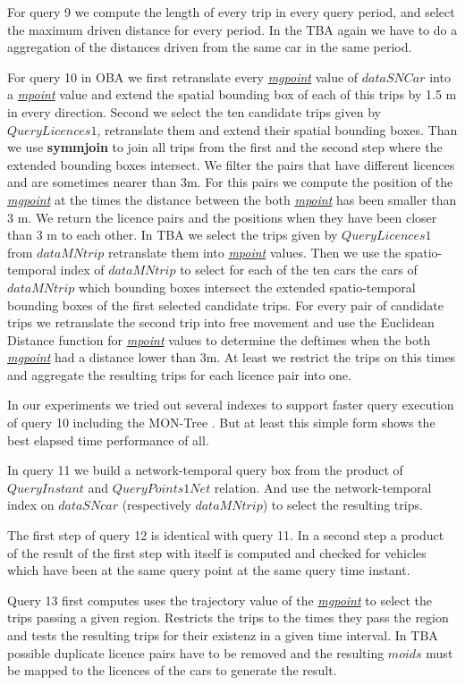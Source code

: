 \documentclass[a4paper]{article}
\newcommand{\op}[1]{\textbf{#1}}
\newcommand{\dt}[1]{\textsl{\underline{#1}}}
\begin{document}
For query 9 we compute the length of every trip in every query period, and select the
 maximum driven distance for every period. In the TBA again we have to do a
 aggregation of the distances driven from the same car in the same period.

For query 10 in OBA we first retranslate every \dt{mgpoint} value of $dataSNCar$ into
 a  \dt{mpoint} value and extend the spatial bounding box of each of this
 trips by 1.5 m in every direction. Second we select the ten candidate trips given by
 $QueryLicences1$, retranslate them and extend their spatial bounding boxes. Than we
 use \op{symmjoin} to join all trips from the first and the second step where the
 extended bounding boxes intersect. We filter the pairs that have different licences
 and are sometimes nearer than 3m. For this pairs we compute the position of the
 \dt{mgpoint} at the times the distance between the both \dt{mpoint} has been smaller
 than 3 m. We return the licence pairs and the positions when they have been closer
 than 3 m to each other. In TBA we select the trips given by $QueryLicences1$ from
$dataMNtrip$ retranslate them into \dt{mpoint} values. Then we use the
spatio-temporal index of $dataMNtrip$ to select for each of the ten cars the cars
of $dataMNtrip$ which bounding boxes intersect the extended spatio-temporal bounding
 boxes of the first selected candidate trips. For every pair of candidate trips we
 retranslate  the second trip into free movement and use the Euclidean Distance
function for \dt{mpoint} values to determine the deftimes when the both \dt{mgpoint}
 had a distance lower than 3m. At least we restrict the trips on this times and
 aggregate the resulting trips for each licence pair into one.

In our experiments we tried out several indexes to support faster query execution of
 query 10 including the MON-Tree \cite{MONTree}. But at least this simple form shows
 the best elapsed time performance of all.

In query 11 we build a network-temporal query box from the product of $QueryInstant$
 and $QueryPoints1Net$ relation. And use the network-temporal index on $dataSNcar$
 (respectively $dataMNtrip$) to select the resulting trips.

The first step of query 12 is identical with query 11. In a second step a product of
 the result of the first step with itself is computed and checked for vehicles which
 have been at the same query point at the same query time instant.

Query 13 first computes uses the trajectory value of the \dt{mgpoint} to select the
 trips passing a given region. Restricts the trips to the times they pass the region
 and tests the resulting trips for their existenz in a given time interval. In TBA
 possible duplicate licence pairs have to be removed and the resulting $moids$ must
 be mapped to the licences of the cars to generate the result.
\end{document}

